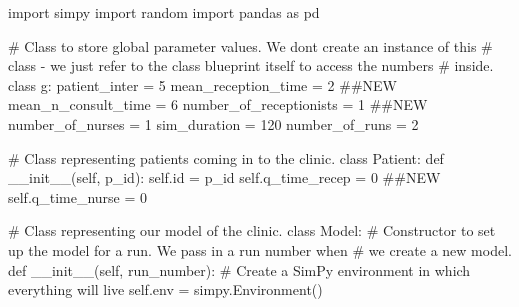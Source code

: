 \documentclass[
  letterpaper,
  DIV=11,
  numbers=noendperiod]{scrreprt}
\newenvironment{Shaded}{}{}
\newcommand{\BuiltInTok}[1]{\textcolor[rgb]{0.84,0.23,0.29}{#1}}
\newcommand{\CommentTok}[1]{\textcolor[rgb]{0.42,0.45,0.49}{#1}}
\newcommand{\DecValTok}[1]{\textcolor[rgb]{0.00,0.36,0.77}{#1}}
\newcommand{\FunctionTok}[1]{\textcolor[rgb]{0.44,0.26,0.76}{#1}}
\newcommand{\ImportTok}[1]{\textcolor[rgb]{0.01,0.18,0.38}{#1}}
\newcommand{\KeywordTok}[1]{\textcolor[rgb]{0.84,0.23,0.29}{#1}}
\newcommand{\NormalTok}[1]{\textcolor[rgb]{0.14,0.16,0.18}{#1}}
\newcommand{\OperatorTok}[1]{\textcolor[rgb]{0.14,0.16,0.18}{#1}}
\newcommand{\VariableTok}[1]{\textcolor[rgb]{0.89,0.38,0.04}{#1}}
\begin{document}
\begin{tcolorbox}[enhanced jigsaw, colframe=quarto-callout-note-color-frame, bottomtitle=1mm, breakable, rightrule=.15mm, coltitle=black, colbacktitle=quarto-callout-note-color!10!white, opacityback=0, leftrule=.75mm, arc=.35mm, toptitle=1mm, title=\textcolor{quarto-callout-note-color}{\faInfo}\hspace{0.5em}{Click here to view the full code}, titlerule=0mm, colback=white, toprule=.15mm, bottomrule=.15mm, left=2mm, opacitybacktitle=0.6]

\begin{Shaded}
\begin{Highlighting}[]
\ImportTok{import}\NormalTok{ simpy}
\ImportTok{import}\NormalTok{ random}
\ImportTok{import}\NormalTok{ pandas }\ImportTok{as}\NormalTok{ pd}

\CommentTok{\# Class to store global parameter values.  We don\textquotesingle{}t create an instance of this}
\CommentTok{\# class {-} we just refer to the class blueprint itself to access the numbers}
\CommentTok{\# inside.}
\KeywordTok{class}\NormalTok{ g:}
\NormalTok{    patient\_inter }\OperatorTok{=} \DecValTok{5}
\NormalTok{    mean\_reception\_time }\OperatorTok{=} \DecValTok{2} \CommentTok{\#\#NEW}
\NormalTok{    mean\_n\_consult\_time }\OperatorTok{=} \DecValTok{6}
\NormalTok{    number\_of\_receptionists }\OperatorTok{=} \DecValTok{1} \CommentTok{\#\#NEW}
\NormalTok{    number\_of\_nurses }\OperatorTok{=} \DecValTok{1}
\NormalTok{    sim\_duration }\OperatorTok{=} \DecValTok{120}
\NormalTok{    number\_of\_runs }\OperatorTok{=} \DecValTok{2}

\CommentTok{\# Class representing patients coming in to the clinic.}
\KeywordTok{class}\NormalTok{ Patient:}
    \KeywordTok{def} \FunctionTok{\_\_init\_\_}\NormalTok{(}\VariableTok{self}\NormalTok{, p\_id):}
        \VariableTok{self}\NormalTok{.}\BuiltInTok{id} \OperatorTok{=}\NormalTok{ p\_id}
        \VariableTok{self}\NormalTok{.q\_time\_recep }\OperatorTok{=} \DecValTok{0} \CommentTok{\#\#NEW}
        \VariableTok{self}\NormalTok{.q\_time\_nurse }\OperatorTok{=} \DecValTok{0}

\CommentTok{\# Class representing our model of the clinic.}
\KeywordTok{class}\NormalTok{ Model:}
    \CommentTok{\# Constructor to set up the model for a run.  We pass in a run number when}
    \CommentTok{\# we create a new model.}
    \KeywordTok{def} \FunctionTok{\_\_init\_\_}\NormalTok{(}\VariableTok{self}\NormalTok{, run\_number):}
        \CommentTok{\# Create a SimPy environment in which everything will live}
        \VariableTok{self}\NormalTok{.env }\OperatorTok{=}\NormalTok{ simpy.Environment()}


\end{Highlighting}
\end{Shaded}
\end{tcolorbox}
\end{document}
